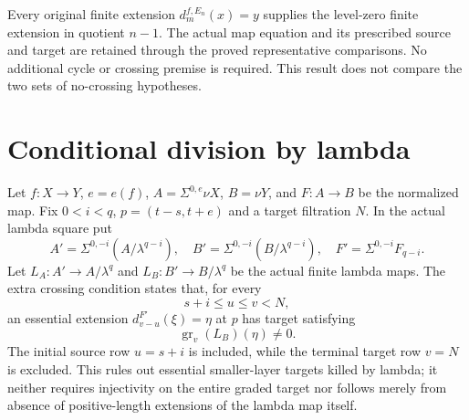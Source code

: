 \begin{theorem}
\label{sem:ProofTools:finite-extension-at-level-zero}
Every original finite extension $d_m^{f,E_n}(x)=y$ supplies the level-zero finite extension in quotient $n-1$. The actual map equation and its prescribed source and target are retained through the proved representative comparisons. No additional cycle or crossing premise is required. This result does not compare the two sets of no-crossing hypotheses.
\end{theorem}

\section{Conditional division by lambda}

\begin{definition}
\label{sem:ProofTools:finite-lambda-kernel-no-crossing}
Let $f:X\to Y$, $e=e(f)$, $A=\Sigma^{0,e}\nu X$, $B=\nu Y$, and $F:A\to B$ be the normalized map. Fix $0<i<q$, $p=(t-s,t+e)$ and a target filtration $N$. In the actual lambda square put
\[
A'=\Sigma^{0,-i}(A/\lambda^{q-i}),\quad
B'=\Sigma^{0,-i}(B/\lambda^{q-i}),\quad
F'=\Sigma^{0,-i}F_{q-i}.
\]
Let $L_A:A'\to A/\lambda^q$ and $L_B:B'\to B/\lambda^q$ be the actual finite lambda maps. The extra crossing condition states that, for every
\[s+i\le u\le v<N,\]
an essential extension $d_{v-u}^{F'}(\xi)=\eta$ at $p$ has target satisfying
\[\operatorname{gr}_v(L_B)(\eta)\ne0.\]
The initial source row $u=s+i$ is included, while the terminal target row $v=N$ is excluded. This rules out essential smaller-layer targets killed by lambda; it neither requires injectivity on the entire graded target nor follows merely from absence of positive-length extensions of the lambda map itself.
\end{definition}

